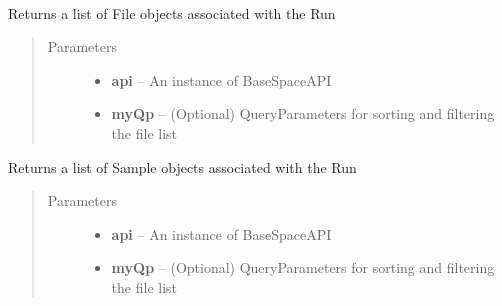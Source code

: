 \documentclass[letterpaper,10pt,english]{sphinxmanual}
\begin{document}
\begin{fulllineitems}
\label{Available modules:BaseSpacePy.model.Run.Run}~

\begin{fulllineitems}
\label{Available modules:BaseSpacePy.model.Run.Run.getFiles}
Returns a list of File objects associated with the Run
\begin{quote}\begin{description}
\item[{Parameters}] \leavevmode\begin{itemize}
\item {} 
\textbf{api} -- An instance of BaseSpaceAPI

\item {} 
\textbf{myQp} -- (Optional) QueryParameters for sorting and filtering the file list

\end{itemize}

\end{description}\end{quote}

\end{fulllineitems}


\begin{fulllineitems}
\label{Available modules:BaseSpacePy.model.Run.Run.getSamples}
Returns a list of Sample objects associated with the Run
\begin{quote}\begin{description}
\item[{Parameters}] \leavevmode\begin{itemize}
\item {} 
\textbf{api} -- An instance of BaseSpaceAPI

\item {} 
\textbf{myQp} -- (Optional) QueryParameters for sorting and filtering the file list

\end{itemize}

\end{description}\end{quote}


\end{fulllineitems}
\end{fulllineitems}
\end{document}
